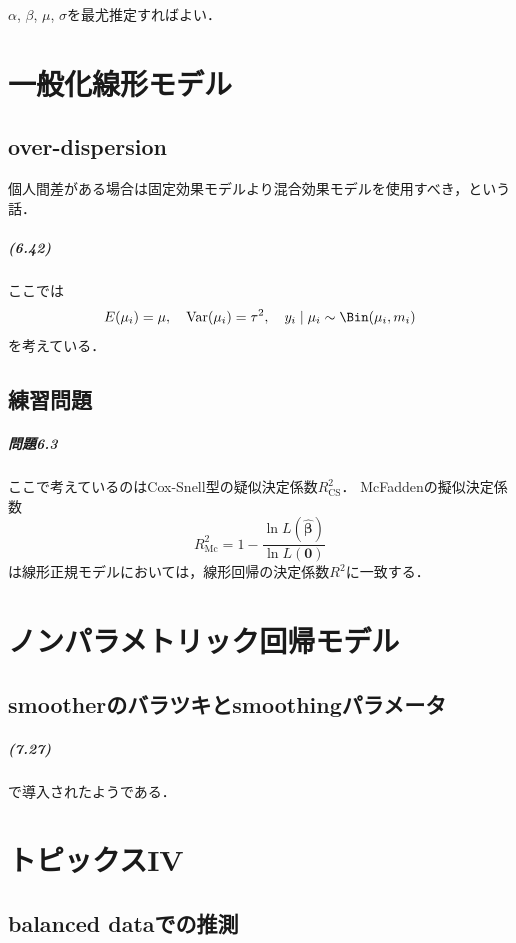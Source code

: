 \(\alpha\), \(\beta\), \(\mu\), \(\sigma\)を最尤推定すればよい．

\chapter{一般化線形モデル}
\setcounter{section}{5}
\section{over-dispersion}
個人間差がある場合は固定効果モデルより混合効果モデルを使用すべき，という話．

\paragraph{(6.42)}
ここでは
\[ E(\mu_i) = \mu , \quad \Var(\mu_i) = \tau^2 , \quad y_i\mid\mu_i \sim \Bin(\mu_i, m_i) \]
を考えている．

\section*{練習問題}
\paragraph{問題6.3}
ここで考えているのはCox-Snell型の疑似決定係数\(R^2_\text{CS}\)．
McFaddenの擬似決定係数
\[ R^2_\text{Mc} = 1- \frac{\ln L(\hat{\boldsymbol\beta})}{\ln L(\boldsymbol{0})} \]
は線形正規モデルにおいては，線形回帰の決定係数\(R^2\)に一致する．

\chapter{ノンパラメトリック回帰モデル}
\setcounter{section}{4}
\section{smootherのバラツキとsmoothingパラメータ}
\paragraph{(7.27)}
\cite{hall1990variance}で導入されたようである．

\setcounter{chapter}{11}
\chapter{トピックスIV}
\setcounter{section}{1}
\section{balanced dataでの推測}
